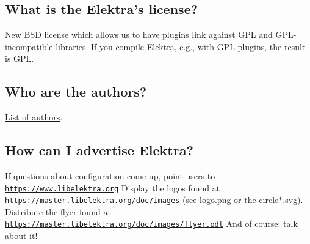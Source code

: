 \subsection*{What is the Elektra’s license?}

New B\+SD license which allows us to have plugins link against G\+PL and G\+P\+L-\/incompatible libraries. If you compile Elektra, e.\+g., with G\+PL plugins, the result is G\+PL.

\subsection*{Who are the authors?}

\hyperlink{doc_AUTHORS_md}{List of authors}.

\subsection*{How can I advertise Elektra?}

If questions about configuration come up, point users to \href{https://www.libelektra.org}{\tt https\+://www.\+libelektra.\+org} Display the logos found at \href{https://master.libelektra.org/doc/images}{\tt https\+://master.\+libelektra.\+org/doc/images} (see logo.\+png or the circle$\ast$.svg). Distribute the flyer found at \href{https://master.libelektra.org/doc/images/flyer.odt}{\tt https\+://master.\+libelektra.\+org/doc/images/flyer.\+odt} And of course\+: talk about it! 